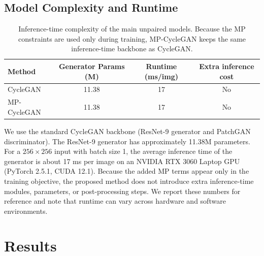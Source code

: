 \documentclass[final,1p,times]{elsarticle}
\begin{document}
\subsection{Model Complexity and Runtime}
\begin{table}[!t]
\centering
\caption{Inference-time complexity of the main unpaired models. Because the MP constraints are used only during training, MP-CycleGAN keeps the same inference-time backbone as CycleGAN.}
\label{tab:complexity}
\begin{tabular}{lccc}
\toprule
Method & Generator Params (M) & Runtime (ms/img) & Extra inference cost \\
\midrule
CycleGAN & 11.38 & 17 & No \\
MP-CycleGAN & 11.38 & 17 & No \\
\bottomrule
\end{tabular}
\end{table}
We use the standard CycleGAN backbone (ResNet-9 generator and PatchGAN discriminator). The ResNet-9 generator has approximately 11.38M parameters. For a $256\times256$ input with batch size 1, the average inference time of the generator is about 17 ms per image on an NVIDIA RTX 3060 Laptop GPU (PyTorch 2.5.1, CUDA 12.1). Because the added MP terms appear only in the training objective, the proposed method does not introduce extra inference-time modules, parameters, or post-processing steps. We report these numbers for reference and note that runtime can vary across hardware and software environments.

\section{Results}
\end{document}
